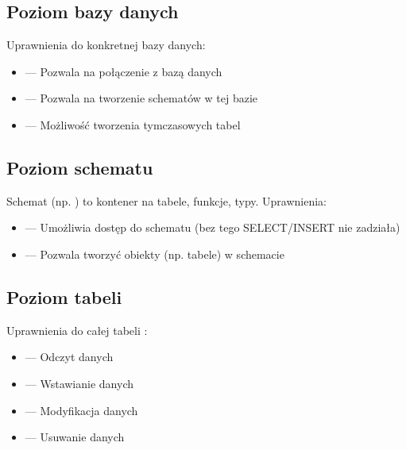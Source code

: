\documentclass[a4paper,11pt,polish]{sphinxmanual}
\begin{document}
\subsection{Poziom bazy danych}
\label{\detokenize{Bezpieczenstwo/index:poziom-bazy-danych}}
\sphinxAtStartPar
Uprawnienia do konkretnej bazy danych:
\begin{itemize}
\item {} 
\sphinxAtStartPar
{} — Pozwala na połączenie z bazą danych

\item {} 
\sphinxAtStartPar
{} — Pozwala na tworzenie schematów w tej bazie

\item {} 
\sphinxAtStartPar
{} — Możliwość tworzenia tymczasowych tabel

\end{itemize}


\subsection{Poziom schematu}
\label{\detokenize{Bezpieczenstwo/index:poziom-schematu}}
\sphinxAtStartPar
Schemat (np. ) to kontener na tabele, funkcje, typy. Uprawnienia:
\begin{itemize}
\item {} 
\sphinxAtStartPar
{} — Umożliwia dostęp do schematu (bez tego SELECT/INSERT nie zadziała)

\item {} 
\sphinxAtStartPar
{} — Pozwala tworzyć obiekty (np. tabele) w schemacie

\end{itemize}


\subsection{Poziom tabeli}
\label{\detokenize{Bezpieczenstwo/index:poziom-tabeli}}
\sphinxAtStartPar
Uprawnienia do całej tabeli :
\begin{itemize}
\item {} 
\sphinxAtStartPar
{} — Odczyt danych

\item {} 
\sphinxAtStartPar
{} — Wstawianie danych

\item {} 
\sphinxAtStartPar
{} — Modyfikacja danych

\item {} 
\sphinxAtStartPar
{} — Usuwanie danych

\end{itemize}
\end{document}

